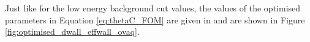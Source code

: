 Just like for the low energy background cut values, the values of the optimised parameters in Equation \ref{eq:thetaC_FOM} are given in \cite{Abe_2019} and are shown in Figure \ref{fig:optimised_dwall_effwall_ovaq}.


\begin{figure}

    \begin{minipage}{.5\linewidth}
    \centering
    \end{minipage}%
    \begin{minipage}{.5\linewidth}
    \centering

\end{minipage}
\end{figure}
